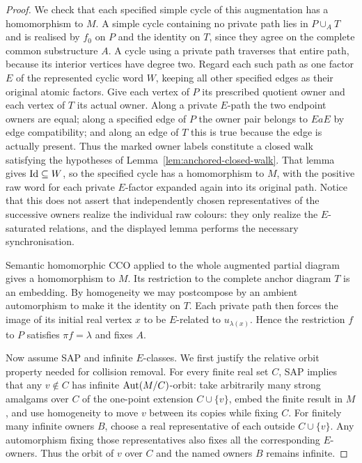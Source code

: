\begin{proof}
We check that each specified simple cycle of this augmentation has
a homomorphism to $M$.  A simple cycle containing no private path
lies in $P\cup_A T$ and is realised by $f_0$ on $P$ and the identity
on $T$, since they agree on the complete common substructure $A$.
A cycle using a private path traverses that entire path, because
its interior vertices have degree two.  Regard each such path as
one factor $E$ of the represented cyclic word $W$, keeping all
other specified edges as their original atomic factors.  Give each
vertex of $P$ its prescribed quotient owner and each vertex of $T$
its actual owner.  Along a private $E$-path the two endpoint owners
are equal; along a specified edge of $P$ the owner pair belongs to
$EaE$ by edge compatibility; and along an edge of $T$ this is
true because the edge is actually present.  Thus the marked owner
labels constitute a closed walk satisfying the hypotheses of
Lemma~\ref{lem:anchored-closed-walk}.  That lemma gives
$\mathrm{Id}\subseteq W$, so the specified cycle has a homomorphism to
$M$, with the positive raw word for each private $E$-factor
expanded again into its original path.  Notice that this does not
assert that independently chosen representatives of the successive
owners realize the individual raw colours: they only realize the
$E$-saturated relations, and the displayed lemma performs the
necessary synchronisation.

Semantic homomorphic CCO applied to the whole augmented partial
diagram gives a homomorphism to $M$.  Its restriction to the complete
anchor diagram $T$ is an embedding.  By homogeneity we may
postcompose by an ambient automorphism to make it the identity on
$T$.  Each private path then forces the image of its initial real
vertex $x$ to be $E$-related to $u_{\lambda(x)}$.  Hence the
restriction $f$ to $P$ satisfies $\pi f=\lambda$ and fixes $A$.

Now assume SAP and infinite $E$-classes.  We first justify the
relative orbit property needed for collision removal.  For every
finite real set $C$, SAP implies that any $v\notin C$ has infinite
$\operatorname{Aut}(M/C)$-orbit: take arbitrarily many strong amalgams over $C$
of the one-point extension $C\cup\{v\}$, embed the finite result in
$M$, and use homogeneity to move $v$ between its copies while fixing
$C$.  For finitely many infinite owners $B$, choose a real
representative of each outside $C\cup\{v\}$.  Any automorphism fixing
those representatives also fixes all the corresponding $E$-owners.
Thus the orbit of $v$ over $C$ and the named owners $B$ remains
infinite.


\end{proof}
